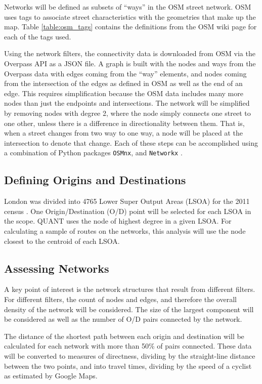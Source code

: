 Networks will be defined as subsets of ``ways'' in the OSM street network. OSM uses tags to associate street characteristics with the geometries that make up the map. Table \ref{table:osm_tags} contains the definitions from the OSM wiki page for each of the tags used.  

Using the network filters, the connectivity data is downloaded from OSM via the Overpass API as a JSON file. A graph is built with the nodes and ways from the Overpass data with edges coming from the ``way'' elements, and nodes coming from the intersection of the edges as defined in OSM as well as the end of an edge. This requires simplification because the OSM data includes many more nodes than just the endpoints and intersections. The network will be simplified by removing nodes with degree 2, where the node simply connects one street to one other, unless there is a difference in directionality between them. That is, when a street changes from two way to one way, a node will be placed at the intersection to denote that change.  Each of these steps can be accomplished using a combination of Python packages \texttt{OSMnx}, \parencite{osmnx} and \texttt{Networkx} \parencite{networkx}.

\subsection{Defining Origins and Destinations}

London was divided into 4765 Lower Super Output Areas (LSOA) for the 2011 census \parencite{lsoa}. One Origin/Destination (O/D) point will be selected for each LSOA in the scope. QUANT uses the node of highest degree in a given LSOA. For calculating a sample of routes on the networks, this analysis will use the node closest to the centroid of each LSOA. 

\subsection{Assessing Networks}

A key point of interest is the network structures that result from different filters. For different filters, the count of nodes and edges, and therefore the overall density of the network will be considered. The size of the largest component will be considered as well as the number of O/D pairs connected by the network. 

The distance of the shortest path between each origin and destination will be calculated for each network with more than 50\% of pairs connected. These data will be converted to measures of directness, dividing by the straight-line distance between the two points, and into travel times, dividing by the speed of a cyclist as estimated by Google Maps. 

